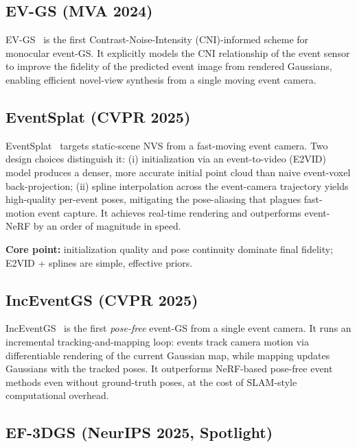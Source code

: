 \subsection{EV-GS (MVA 2024)}
\label{sec:static:evgs}

EV-GS~\cite{wu2024evgs} is the first Contrast-Noise-Intensity (CNI)-informed scheme for monocular event-GS. It explicitly models the CNI relationship of the event sensor to improve the fidelity of the predicted event image from rendered Gaussians, enabling efficient novel-view synthesis from a single moving event camera.

\subsection{EventSplat (CVPR 2025)}
\label{sec:static:eventsplat}

EventSplat~\cite{yura2025eventsplat} targets static-scene NVS from a fast-moving event camera. Two design choices distinguish it: (i) initialization via an event-to-video (E2VID) model produces a denser, more accurate initial point cloud than naive event-voxel back-projection; (ii) spline interpolation across the event-camera trajectory yields high-quality per-event poses, mitigating the pose-aliasing that plagues fast-motion event capture. It achieves real-time rendering and outperforms event-NeRF by an order of magnitude in speed.

\textbf{Core point:} initialization quality and pose continuity dominate final fidelity; E2VID + splines are simple, effective priors.

\subsection{IncEventGS (CVPR 2025)}
\label{sec:static:inceventgs}

IncEventGS~\cite{huang2025inceventgs} is the first \emph{pose-free} event-GS from a single event camera. It runs an incremental tracking-and-mapping loop: events track camera motion via differentiable rendering of the current Gaussian map, while mapping updates Gaussians with the tracked poses. It outperforms NeRF-based pose-free event methods even without ground-truth poses, at the cost of SLAM-style computational overhead.

\subsection{EF-3DGS (NeurIPS 2025, Spotlight)}
\label{sec:static:ef3dgs}

